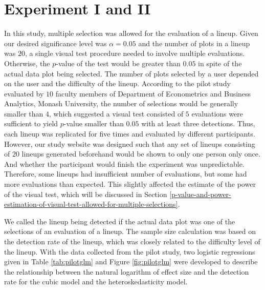 \documentclass{monashthesis}
\theoremstyle{definition}
\theoremstyle{definition}
\theoremstyle{definition}
\theoremstyle{definition}
\theoremstyle{remark}
\begin{document}
\hypertarget{experiment-i-and-ii}{%
\section{Experiment I and II}\label{experiment-i-and-ii}}

In this study, multiple selection was allowed for the evaluation of a lineup. Given our desired significance level was \(\alpha = 0.05\) and the number of plots in a lineup was \(20\), a single visual test procedure needed to involve multiple evaluations. Otherwise, the \(p\)-value of the test would be greater than \(0.05\) in spite of the actual data plot being selected. The number of plots selected by a user depended on the user and the difficulty of the lineup. According to the pilot study evaluated by \(10\) faculty members of Department of Econometrics and Business Analytics, Monash University, the number of selections would be generally smaller than \(4\), which suggested a visual test consisted of \(5\) evaluations were sufficient to yield \(p\)-value smaller than \(0.05\) with at least three detections. Thus, each lineup was replicated for five times and evaluated by different participants. However, our study website was designed such that any set of lineups consisting of 20 lineups generated beforehand would be shown to only one person only once. And whether the participant would finish the experiment was unpredictable. Therefore, some lineups had insufficient number of evaluations, but some had more evaluations than expected. This slightly affected the estimate of the power of the visual test, which will be discussed in Section \ref{p-value-and-power-estimation-of-visual-test-allowed-for-multiple-selections}.

We called the lineup being detected if the actual data plot was one of the selections of an evaluation of a lineup. The sample size calculation was based on the detection rate of the lineup, which was closely related to the difficulty level of the lineup. With the data collected from the pilot study, two logistic regressions given in Table \ref{tab:pilotglm} and Figure \ref{fig:pilotglm} were developed to describe the relationship between the natural logarithm of effect size and the detection rate for the cubic model and the heteroskedasticity model.
\end{document}
